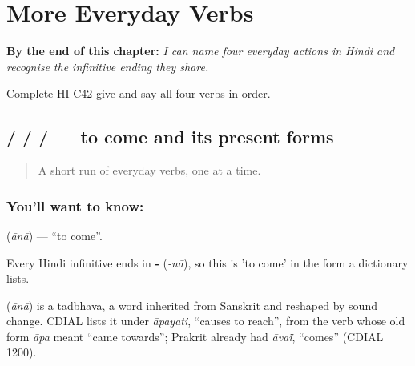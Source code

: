 
\chapter{More Everyday Verbs}
\label{ch:hi-more-verbs}

\begin{chapteropening}
\textbf{By the end of this chapter:} \emph{I can name four everyday actions in Hindi and recognise the infinitive ending they share.}

Complete HI-C42-give and say all four verbs in order.
\end{chapteropening}

\section[\texorpdfstring{\hi{आना} / \hi{आता} / \hi{आती} … (ānā / ātā / ātī …)}{आना / आता / आती … (ānā / ātā / ātī …)}]{ /  /  /  — to come and its present forms}

\label{lesson:HI-C42-come}



\begin{quote}
A short run of everyday verbs, one at a time.
\end{quote}

\subsection*{You'll want to know: }
\textbf{} (\emph{ānā}) — \textquotedblleft{}to come\textquotedblright{}.

Every Hindi infinitive ends in \textbf{-} (\emph{-nā}), so this is 'to come' in the form a dictionary lists.

\begin{cousinweb}
\textbf{} (\emph{ānā}) is a tadbhava, a word inherited from Sanskrit and reshaped by sound change. CDIAL lists it under \emph{āpayati}, \textquotedblleft{}causes to reach\textquotedblright{}, from the verb whose old form \emph{āpa} meant \textquotedblleft{}came towards\textquotedblright{}; Prakrit already had \emph{āvaï}, \textquotedblleft{}comes\textquotedblright{} (CDIAL 1200).
\end{cousinweb}


